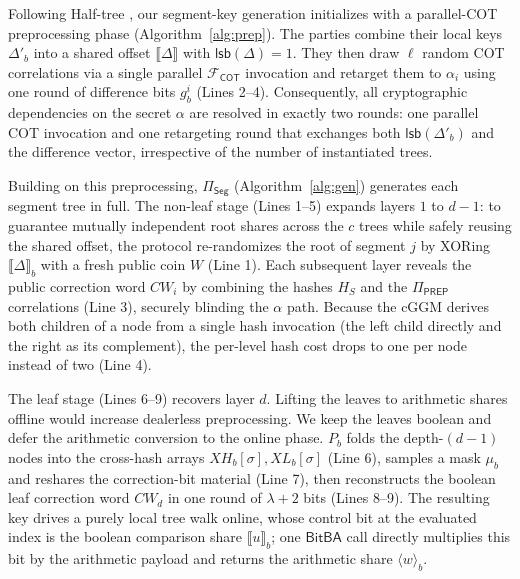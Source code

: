 \documentclass[journal]{IEEEtran}
\theoremstyle{definition}
\theoremstyle{plain}
\newcommand{\ashare}[1]{\langle #1 \rangle}             %
\newcommand{\bshare}[1]{\llbracket #1 \rrbracket}        %
\newcommand{\Fcot}{\mathcal{F}_{\mathsf{COT}}}
\newcommand{\lsb}{\mathsf{lsb}}
\newcommand{\BitBA}{\mathsf{BitBA}}
\newcommand{\PREP}{\Pi_{\mathsf{PREP}}}
\newcommand{\seg}[1]{^{\scriptscriptstyle(#1)}}   %
\newcommand{\nseg}{c}                              %
\newcommand{\wseg}{w}                              %
\begin{document}
Following Half-tree \cite{halftree}, our segment-key generation initializes with a parallel-COT preprocessing phase
(Algorithm~\ref{alg:prep}). The parties combine their local keys $\Delta'_b$
into a shared offset $\bshare{\Delta}$ with $\lsb(\Delta)=1$. They then draw $\ell$ random COT correlations via a
single parallel $\Fcot$ invocation and retarget them to $\alpha_i$ using one round of difference bits $g^i_b$ (Lines 2--4).
Consequently, all cryptographic dependencies on the secret $\alpha$ are resolved in exactly two rounds:
one parallel COT invocation and one retargeting round that exchanges both $\lsb(\Delta'_b)$ and the difference vector, irrespective of the number of instantiated trees.

Building on this preprocessing, $\Pi_{\mathsf{Seg}}$ (Algorithm~\ref{alg:gen})
generates each segment tree in full. The non-leaf stage (Lines 1--5) expands layers
$1$ to $d{-}1$: to guarantee mutually independent root shares across the $\nseg$ trees
while safely reusing the shared offset, the protocol re-randomizes the root of segment
$j$ by XORing $\bshare{\Delta}_b$ with a fresh public coin $W$ (Line 1). Each subsequent
layer reveals the public correction word $\mathit{CW}_i$ by combining the hashes $H_S$
and the $\PREP$ correlations (Line 3), securely blinding the $\alpha$ path. Because the
cGGM derives both children of a node from a single hash invocation (the left
child directly and the right as its complement), the per-level hash cost drops
to one per node instead of two (Line 4).

The leaf stage (Lines 6--9) recovers layer $d$. Lifting the leaves to
arithmetic shares offline would increase dealerless preprocessing. We keep
the leaves boolean and defer the arithmetic
conversion to the online phase. $P_b$ folds the depth-$(d{-}1)$ nodes into the cross-hash
arrays $XH_b[\sigma],XL_b[\sigma]$ (Line 6), samples a mask $\mu_b$ and reshares the
correction-bit material (Line 7), then reconstructs the boolean leaf correction word
$\mathit{CW}_d$ in one round of $\lambda{+}2$ bits (Lines 8--9). The resulting key drives
a purely local tree walk online, whose control bit at the evaluated index is the boolean
comparison share $\bshare{u}_b$; one $\BitBA$ call directly multiplies this bit
by the arithmetic payload and returns the arithmetic share $\ashare{w}_b$.

\end{document}
